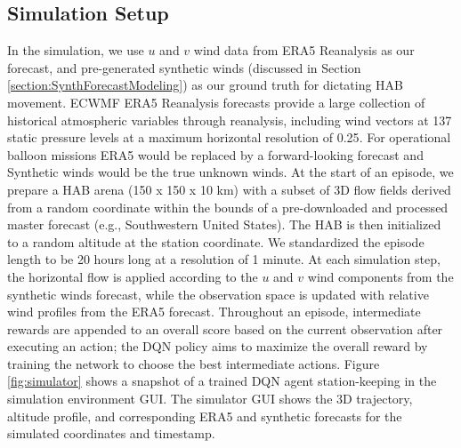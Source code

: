 \subsection{Simulation Setup}\label{section:SimEnvforDQN_SimStructure}


In the simulation, we use $u$ and $v$ wind data from ERA5 Reanalysis as our forecast, and pre-generated synthetic winds (discussed in Section \ref{section:SynthForecastModeling}) as our ground truth for dictating HAB movement. ECWMF ERA5 Reanalysis forecasts provide a large collection of historical atmospheric variables through reanalysis, including wind vectors at 137 static pressure levels at a maximum horizontal resolution of 0.25\degree \cite{hersbach2018era5}. For operational balloon missions ERA5 would be replaced by a forward-looking forecast and Synthetic winds would be the true unknown winds. At the start of an episode, we prepare a HAB arena (150 x 150 x 10 km) with a subset of 3D flow fields derived from a random coordinate within the bounds of a pre-downloaded and processed master forecast (e.g., Southwestern United States).  The HAB is then initialized to a random altitude at the station coordinate. We standardized the episode length to be 20 hours long at a resolution of 1 minute. %
At each simulation step, the horizontal flow is applied according to the $u$ and $v$ wind components from the synthetic winds forecast, while the observation space is updated with relative wind profiles from the ERA5 forecast. 
Throughout an episode, intermediate rewards are appended to an overall score based on the current observation after executing an action; the DQN policy aims to maximize the overall reward by training the network to choose the best intermediate actions.
 Figure \ref{fig:simulator} shows a snapshot of a trained DQN agent station-keeping in the simulation environment GUI.  The simulator GUI shows the 3D trajectory, altitude profile, and corresponding ERA5 and synthetic forecasts for the simulated coordinates and timestamp.  



